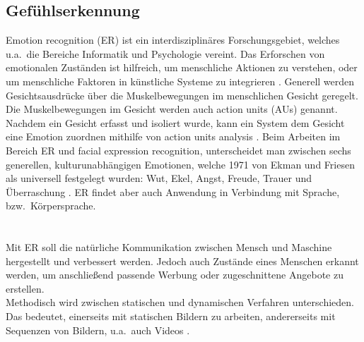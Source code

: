 \subsection{Gefühlserkennung}
Emotion recognition (ER) ist ein interdisziplinäres Forschungsgebiet, welches u.a.~die Bereiche Informatik und Psychologie vereint. Das Erforschen von emotionalen Zuständen ist hilfreich, um menschliche Aktionen zu verstehen, oder um menschliche Faktoren in künstliche Systeme zu integrieren \cite{eyetrackemotionrec}.
Generell werden Gesichtsausdrücke über die Muskelbewegungen im menschlichen Gesicht geregelt. Die Muskelbewegungen im Gesicht werden auch action units (AUs) genannt. Nachdem ein Gesicht erfasst und isoliert wurde, kann ein System dem Gesicht eine Emotion zuordnen mithilfe von action units analysis \cite{wildemotionrec}.
Beim Arbeiten im Bereich ER und facial expression recognition, unterscheidet man zwischen sechs generellen, kulturunabhängigen Emotionen, welche 1971 von Ekman und Friesen als universell festgelegt wurden: Wut, Ekel, Angst, Freude, Trauer und Überraschung \cite{cnnemotionrec}.
ER findet aber auch Anwendung in Verbindung mit Sprache, bzw.~Körpersprache.\\
\\
\\
Mit ER soll die natürliche Kommunikation zwischen Mensch und Maschine hergestellt und verbessert werden. Jedoch auch Zustände eines Menschen erkannt werden, um anschließend passende Werbung oder zugeschnittene Angebote zu erstellen.\\Methodisch wird zwischen statischen und dynamischen Verfahren unterschie\-den. Das bedeutet, einerseits mit statischen Bildern zu arbeiten, andererseits mit Sequenzen von Bildern, u.a.~auch Videos \cite{facialemotionrecusingcnn}.
\\
